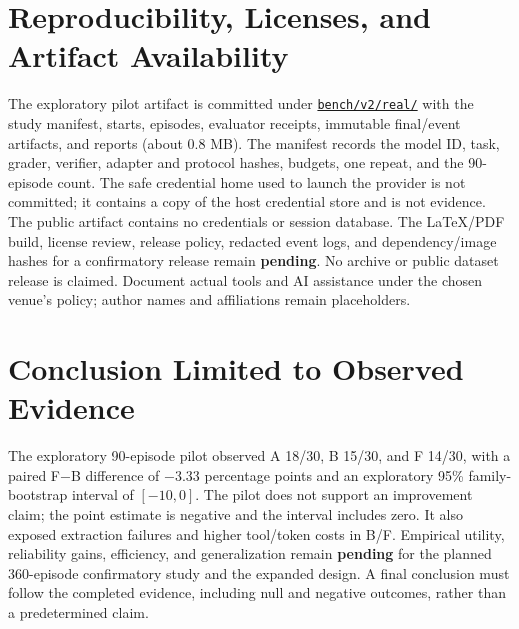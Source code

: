 \documentclass{article}
\begin{document}
\section{Reproducibility, Licenses, and Artifact Availability}
The exploratory pilot artifact is committed under
\href{../bench/v2/real/README.md}{\texttt{bench/v2/real/}} with the study
manifest, starts, episodes, evaluator receipts, immutable final/event
artifacts, and reports (about 0.8 MB). The manifest records the model ID, task,
grader, verifier, adapter and protocol hashes, budgets, one repeat, and the
90-episode count. The safe credential home used to launch the provider is not
committed; it contains a copy of the host credential store and is not evidence.
The public artifact contains no credentials or session database. The LaTeX/PDF
build, license review, release policy, redacted event logs, and dependency/image
hashes for a confirmatory release remain \textbf{pending}. No archive or public
dataset release is claimed. Document actual tools and AI assistance under the
chosen venue's policy; author names and affiliations remain placeholders.

\section{Conclusion Limited to Observed Evidence}
The exploratory 90-episode pilot observed A 18/30, B 15/30, and F 14/30, with a
paired F$-$B difference of $-3.33$ percentage points and an exploratory 95\%
family-bootstrap interval of $[-10,0]$. The pilot does not support an
improvement claim; the point estimate is negative and the interval includes
zero. It also exposed extraction failures and higher tool/token costs in B/F.
Empirical utility, reliability gains, efficiency, and generalization remain
\textbf{pending} for the planned 360-episode confirmatory study and the
expanded design. A final conclusion must follow the completed evidence,
including null and negative outcomes, rather than a predetermined claim.



\end{document}
